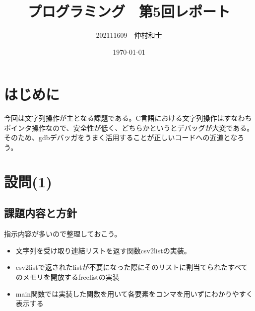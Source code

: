\documentclass[dvipdfmx,12pt,a4j]{jarticle}
\title{プログラミング　第5回レポート}
\author{202111609　仲村和士}
\date{\today}
\begin{document}
\maketitle

\section{はじめに}
今回は文字列操作が主となる課題である。C言語における文字列操作はすなわちポインタ操作なので、安全性が低く、どちらかというとデバッグが大変である。そのため、gdbデバッガをうまく活用することが正しいコードへの近道となろう。

\section{設問(1)}
\subsection{課題内容と方針}\label{sec:q1}
指示内容が多いので整理しておこう。
\begin{itemize}
  \item 文字列を受け取り連結リストを返す関数csv2listの実装。
  \item csv2listで返されたlistが不要になった際にそのリストに割当てられたすべてのメモリを開放するfreelistの実装
  \item main関数では実装した関数を用いて各要素をコンマを用いずにわかりやすく表示する
\end{itemize}
\end{document}

